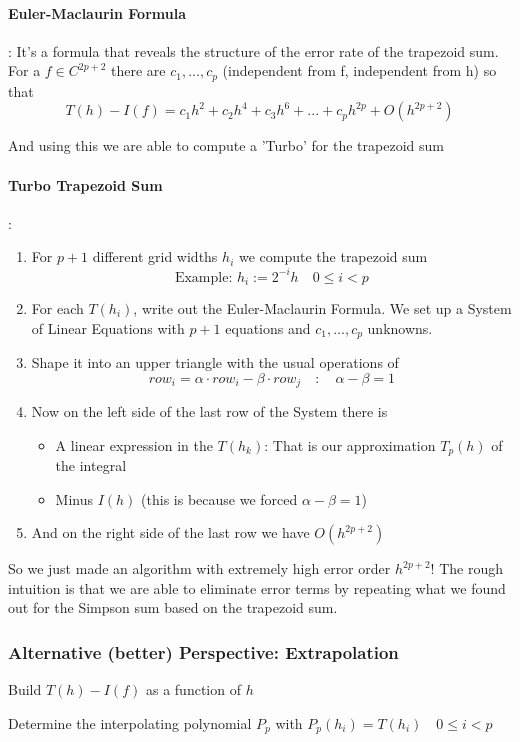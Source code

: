 \documentclass{article}
\begin{document}
\paragraph{Euler-Maclaurin Formula}: It's a formula that reveals the structure of the error rate of the trapezoid sum. For a $f \in C^{2p+2}$ there are $c_1,...,c_p$ (independent from f, independent from h) so that
\[T(h) - I(f) = c_1h^2 + c_2h^4 + c_3h^6 + ...+c_ph^{2p} + O(h^{2p+2})\]

And using this we are able to compute a 'Turbo' for the trapezoid sum
\paragraph{Turbo Trapezoid Sum}: 
\begin{enumerate}
  \item For $p+1$ different grid widths $h_i$ we compute the trapezoid sum
  \[\text{Example: }h_i := 2^{-i}h \quad 0 \leq i < p\]
  \item For each $T(h_i)$, write out the Euler-Maclaurin Formula. We set up a System of Linear Equations with $p+1$ equations and $c_1,...,c_p$ unknowns.
  \item Shape it into an upper triangle with the usual operations of
  \[row_i = \alpha\cdot row_i - \beta\cdot row_j \quad : \quad \alpha - \beta = 1\]
  \item Now on the left side of the last row of the System there is
  \begin{itemize}
    \item A linear expression in the $T(h_k)$: That is our approximation $T_p(h)$ of the integral
    \item Minus $I(h)$ (this is because we forced $\alpha-\beta = 1$)
  \end{itemize}
  \item And on the right side of the last row we have $O(h^{2p+2})$
\end{enumerate}
So we just made an algorithm with extremely high error order $h^{2p+2}$! The rough intuition is that we are able to eliminate error terms by repeating what we found out for the Simpson sum based on the trapezoid sum.

\subsubsection{Alternative (better) Perspective: Extrapolation}
Build $T(h) - I(f)$ as a function of $h$

Determine the interpolating polynomial $P_p$ with $P_p(h_i) = T(h_i) \quad 0 \leq i < p$
\end{document}
